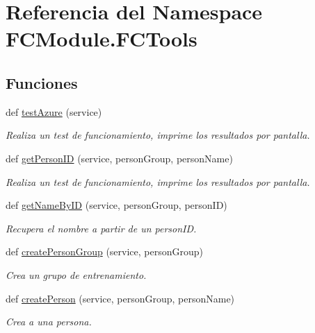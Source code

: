 \hypertarget{namespace_f_c_module_1_1_f_c_tools}{}\section{Referencia del Namespace F\+C\+Module.\+F\+C\+Tools}
\label{namespace_f_c_module_1_1_f_c_tools}
\subsection*{Funciones}
\begin{DoxyCompactItemize}
\item 
def \mbox{\hyperlink{namespace_f_c_module_1_1_f_c_tools_a97937928e5d262ee170874d1a84cf612}{test\+Azure}} (service)
\begin{DoxyCompactList}\small\item\em Realiza un test de funcionamiento, imprime los resultados por pantalla. \end{DoxyCompactList}\item 
def \mbox{\hyperlink{namespace_f_c_module_1_1_f_c_tools_a67657f08b02e1202300530334a92de19}{get\+Person\+ID}} (service, person\+Group, person\+Name)
\begin{DoxyCompactList}\small\item\em Realiza un test de funcionamiento, imprime los resultados por pantalla. \end{DoxyCompactList}\item 
def \mbox{\hyperlink{namespace_f_c_module_1_1_f_c_tools_af728b8917192873f11795aef2dd201ce}{get\+Name\+By\+ID}} (service, person\+Group, person\+ID)
\begin{DoxyCompactList}\small\item\em Recupera el nombre a partir de un person\+ID. \end{DoxyCompactList}\item 
def \mbox{\hyperlink{namespace_f_c_module_1_1_f_c_tools_a2f1857b9750405992109bb659d4a2cfa}{create\+Person\+Group}} (service, person\+Group)
\begin{DoxyCompactList}\small\item\em Crea un grupo de entrenamiento. \end{DoxyCompactList}\item 
def \mbox{\hyperlink{namespace_f_c_module_1_1_f_c_tools_a890f0f5e33c8b92c05c00876daeb756a}{create\+Person}} (service, person\+Group, person\+Name)
\begin{DoxyCompactList}\small\item\em Crea a una persona. \end{DoxyCompactList}\item 

\end{DoxyCompactItemize}
